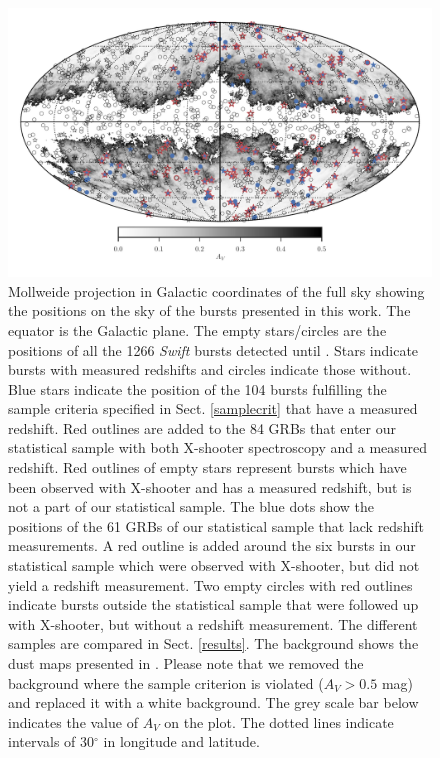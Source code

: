 \documentclass[longauth]{aa}    %
\begin{document}
\begin{figure}
	\centerline{\includegraphics[width=\linewidth]{figures/skymap.pdf}} \caption{Mollweide projection
	in Galactic coordinates of the full sky showing the positions on the sky of the
	bursts presented in this work. The equator is the Galactic plane. The empty
	stars/circles are the positions of all the 1266 \textit{Swift} bursts detected
	until \termdate. Stars indicate bursts with measured redshifts and circles
	indicate those without. Blue stars indicate the position of the 104 bursts
	fulfilling the sample criteria specified in Sect. \ref{samplecrit} that have a
	measured redshift. Red outlines are added to the 84 GRBs that enter our
	statistical sample with both X-shooter spectroscopy and a measured redshift.
	Red outlines of empty stars represent bursts which have been observed with
	X-shooter and has a measured redshift, but is not a part of our statistical
	sample. The blue dots show the positions of the 61 GRBs of our statistical
	sample that lack redshift measurements. A red outline is added around the six
	bursts in our statistical sample which were observed with X-shooter, but did
	not yield a redshift measurement. Two empty circles with red outlines indicate
	bursts outside the statistical sample that were followed up with X-shooter, but
	without a redshift measurement. The different samples are compared in Sect.
	\ref{results}. The background shows the dust maps presented in
	\citet{Schlegel1998}. Please note that we removed the background where the
	sample criterion is violated ($A_V > 0.5$ mag) and replaced it with a white
	background. The grey scale bar below indicates the value of $A_V$ on the plot.
	The dotted lines indicate intervals of 30$^\circ$ in longitude and latitude.}
\label{fig:skymap}
\end{figure}
\end{document}
